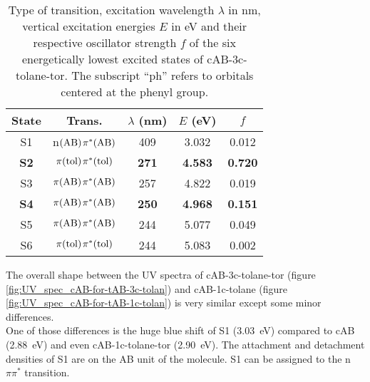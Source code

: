\begin{table}[b]
  \caption{Type of transition, excitation wavelength $\lambda$ in nm, vertical excitation energies $E$ in eV and their respective oscillator strength $f$ of the six energetically lowest excited states of cAB-3c-tolane-tor. The subscript ``ph'' refers to orbitals centered at the phenyl group.}
  \label{tab:excited_states_cAB_3c_tolane}
  \vspace{0.1 cm}
  \centering
  \begin{tabular}{ccccc}
  \toprule
  State & Trans.&$\lambda$ (nm)  & $E$ (eV)               & $f$                 \\ 
  \midrule
  S1    & n$\mathrm{(AB)}\hspace{1 pt} \pi^{*}\mathrm{(AB)}$ & 409             & 3.032                  & 0.012               \\
  \textbf{S2}    &$\pi\mathrm{(tol)}\hspace{1 pt} \pi^{*}\mathrm{(tol)}$ & \textbf{271}    & \textbf{4.583}         & \textbf{0.720}      \\
  S3    &$\pi\mathrm{(AB)}\hspace{1 pt} \pi^{*}\mathrm{(AB)}$ & 257             & 4.822                  & 0.019               \\
  \textbf{S4}    &$\pi\mathrm{(AB)}\hspace{1 pt} \pi^{*}\mathrm{(AB)}$ & \textbf{250}    & \textbf{4.968}         & \textbf{0.151}      \\
  S5    &$\pi\mathrm{(AB)}\hspace{1 pt} \pi^{*}\mathrm{(AB)}$ & 244             & 5.077                  & 0.049               \\
  S6    &$\pi\mathrm{(tol)}\hspace{1 pt} \pi^{*}\mathrm{(tol)}$ & 244             & 5.083                  & 0.002               \\
  \bottomrule
  \end{tabular}
  \end{table}
%
%
%  
The overall shape between the UV spectra of cAB-3c-tolane-tor (figure \ref{fig:UV_spec_cAB-for-tAB-3c-tolan}) and cAB-1c-tolane (figure \ref{fig:UV_spec_cAB-for-tAB-1c-tolan}) is very similar except some minor differences. \\
One of those differences is the huge blue shift of S1 (\SI{3.03}{\eV}) compared to cAB (\SI{2.88}{\eV}) and even cAB-1c-tolane-tor (\SI{2.90}{\eV}). 
The attachment and detachment densities of S1 are on the AB unit of the molecule.
S1 can be assigned to the n$\pi\pi^*$ transition. \\
